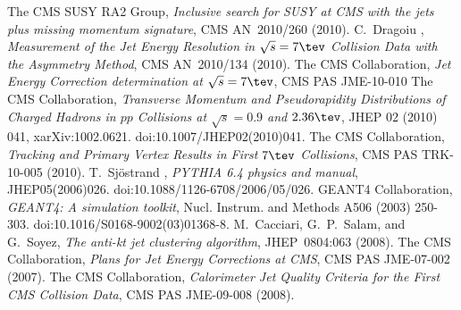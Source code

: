 \documentclass[a4paper]{cmspaper} %
\begin{document}
\begin{thebibliography}{9}
 The CMS SUSY RA2 Group,
  \textit{Inclusive search for SUSY at CMS with the jets plus missing
    momentum signature},
  CMS AN~2010/260 (2010).
 C.~Dragoiu \etal,
  \textit{Measurement of the Jet Energy Resolution in $\sqrt{s}=7\tev$
    Collision Data with the Asymmetry Method},
  CMS AN~2010/134 (2010).
 The CMS Collaboration,
  \textit{Jet Energy Correction determination at
    \mbox{$\sqrt{s}=7\tev$}},
  CMS PAS JME-10-010
 The CMS Collaboration,
  \textit{Transverse Momentum and Pseudorapidity Distributions of
    Charged Hadrons in $pp$ Collisions at \mbox{$\sqrt{s} = 0.9$} and $2.36\tev$}, JHEP 02 (2010) 041,
 xarXiv:1002.0621. doi:10.1007/JHEP02(2010)041.
 The CMS Collaboration,
  \textit{Tracking and Primary Vertex Results in First $7\tev$ Collisions},
  CMS PAS TRK-10-005 (2010).
 T.~Sj\"ostrand \etal,
  \textit{PYTHIA 6.4 physics and manual},
  JHEP05(2006)026. doi:10.1088/1126-6708/2006/05/026.
 GEANT4 Collaboration,
  \textit{GEANT4: A simulation toolkit},
  Nucl. Instrum. and Methods A506 (2003) 250-303. doi:10.1016/S0168-9002(03)01368-8.
 M.~Cacciari, G.~P.~Salam, and G.~Soyez,
  \textit{The anti-kt jet clustering algorithm},
  JHEP~0804:063 (2008).
 The CMS Collaboration,
  \textit{Plans for Jet Energy Corrections at CMS},
  CMS PAS JME-07-002 (2007).
  The CMS Collaboration,
  \textit{Calorimeter Jet Quality Criteria for the First CMS Collision Data},
  CMS PAS JME-09-008 (2008).
\end{thebibliography}
\end{document}

